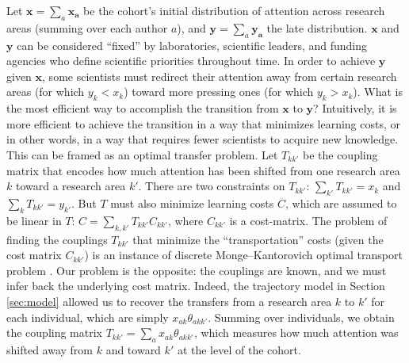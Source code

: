 \documentclass{article}
\begin{document}
Let $\bm{x}=\sum_a \bm{x_a}$ be the cohort's initial distribution of attention across research areas (summing over each author $a$), and $\bm{y}=\sum_a \bm{y_a}$ the late distribution. $\bm{x}$ and $\bm{y}$ can be considered ``fixed'' by laboratories, scientific leaders, and funding agencies who define scientific priorities throughout time. In order to achieve $\bm{y}$ given $\bm{x}$, some scientists must redirect their attention away from certain research areas (for which $y_k<x_k$) toward more pressing ones (for which $y_k>x_k$). What is the most efficient way to accomplish the transition from $\bm{x}$ to $\bm{y}$? Intuitively, it is more efficient to achieve the transition in a way that minimizes learning costs, or in other words, in a way that requires fewer scientists to acquire new knowledge. This can be framed as an optimal transfer problem. Let $T_{kk'}$ be the coupling matrix that encodes how much attention has been shifted from one research area $k$ toward a research area $k'$. There are two constraints on $T_{kk'}$: $\sum_{k'} T_{kk'} = x_k$ and $\sum_{k} T_{kk'} = y_{k'}$. But $T$ must also minimize learning costs $C$, which are assumed to be linear in $T$: $C=\sum_{k,k'}T_{kk'}C_{kk'}$, where $C_{kk'}$ is a cost-matrix. The problem of finding the couplings $T_{kk'}$ that minimize the ``transportation'' costs (given the cost matrix $C_{kk'}$) is an instance of discrete Monge–Kantorovich optimal transport problem \citep{Peyre2018}. Our problem is the opposite: the couplings are known, and we must infer back the underlying cost matrix. Indeed, the trajectory model in Section \ref{sec:model} allowed us to recover the transfers from a research area $k$ to $k'$ for each individual, which are simply $x_{ak}\theta_{akk'}$. Summing over individuals, we obtain the coupling matrix $T_{kk'}=\sum_a x_{ak} \theta_{akk'}$, which measures how much attention was shifted away from $k$ and toward $k'$ at the level of the cohort.
\end{document}
